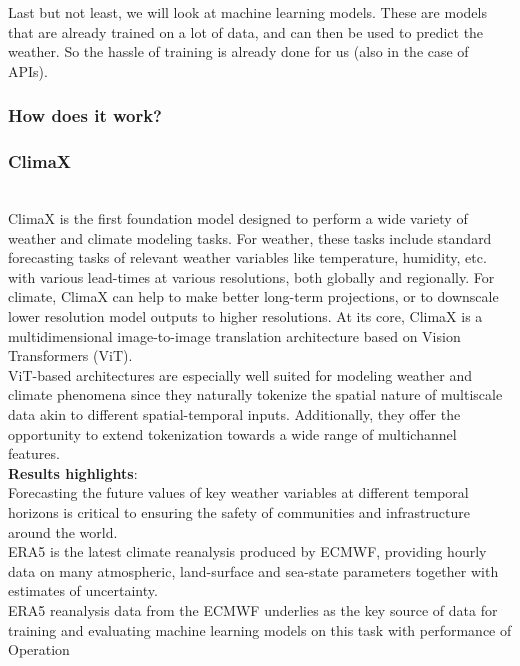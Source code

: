 \documentclass[../paper.tex]{subfiles}
\begin{document}
    Last but not least, we will look at machine learning models.
    These are models that are already trained on a lot of data, and can then be used to predict the weather.
    So the hassle of training is already done for us (also in the case of APIs).

    \subsubsection{How does it work?}

    \subsubsection{ClimaX}
        \hfill\\
        ClimaX is the first foundation model designed to perform a wide variety of weather and climate modeling tasks.
        For weather, these tasks include standard forecasting tasks of relevant weather variables like temperature,
        humidity, etc.
        with various lead-times at various resolutions, both globally and regionally.
        For climate, ClimaX can help to make better long-term projections,
        or to downscale lower resolution model outputs to higher resolutions.
        At its core, ClimaX is a multidimensional image-to-image translation architecture based on Vision Transformers
        (ViT).\\
        ViT-based architectures are especially well suited for modeling weather and climate phenomena
        since they naturally tokenize the spatial nature of multiscale data akin to different spatial-temporal inputs.
        Additionally,
        they offer the opportunity to extend tokenization towards a wide range of multichannel features\cite{d1}.
        \\
        \textbf{Results highlights}:\\
            Forecasting the future values of key weather variables at different temporal horizons is critical
            to ensuring the safety of communities and infrastructure around the world.\\
            ERA5 is the latest climate reanalysis produced by ECMWF,
            providing hourly data on many atmospheric,
            land-surface and sea-state parameters together with estimates of uncertainty\cite{d2}. \\
            ERA5 reanalysis data from the ECMWF underlies as the key source of data for training
            and evaluating machine learning models on this task with performance of Operation
\end{document}
